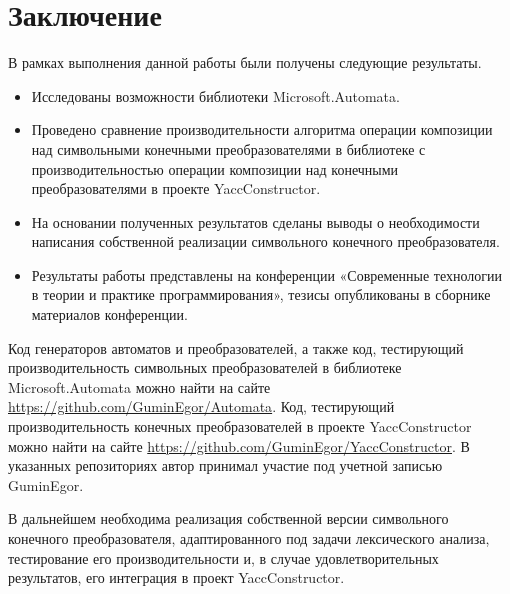 \section*{Заключение}
В рамках выполнения данной работы были получены следующие результаты.
\begin{itemize}
\item Исследованы возможности библиотеки Microsoft.Automata.
\item Проведено сравнение производительности алгоритма операции композиции над символьными конечными преобразователями в библиотеке с производительностью операции композиции над конечными преобразователями в проекте YaccConstructor.
\item На основании полученных результатов сделаны выводы о необходимости написания собственной реализации символьного конечного преобразователя.
\item Результаты работы представлены на конференции «Современные технологии в теории и практике программирования», тезисы опубликованы в сборнике материалов конференции.
\end{itemize}

Код генераторов автоматов и преобразователей, а также код, тестирующий производительность символьных преобразователей в библиотеке Microsoft.Automata можно найти на сайте \url{https://github.com/GuminEgor/Automata}. Код, тестирующий производительность конечных преобразователей в проекте  YaccConstructor можно найти на сайте \url{https://github.com/GuminEgor/YaccConstructor}. В указанных репозиториях автор принимал участие под учетной записью GuminEgor.

В дальнейшем необходима реализация собственной версии символьного конечного преобразователя, адаптированного под задачи лексического анализа, тестирование его производительности и, в случае удовлетворительных результатов, его интеграция в проект YaccConstructor.

